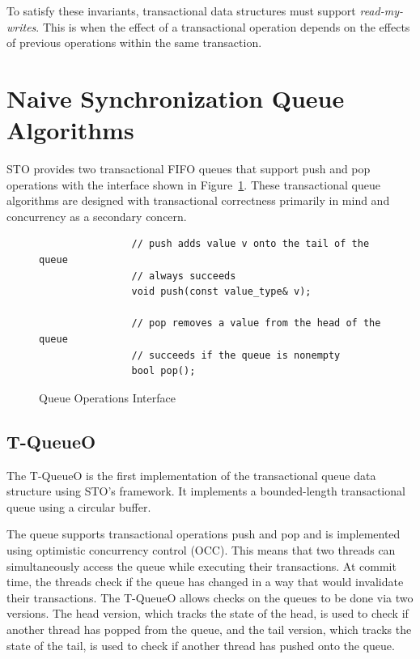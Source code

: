 \noindent
To satisfy these invariants, transactional data structures must support \emph{read-my-writes}. This is when the effect of a transactional operation depends on the effects of previous operations within the same transaction.

\section{Naive Synchronization Queue Algorithms}

STO provides two transactional FIFO queues that support push and pop operations with the interface shown in Figure~\ref{fig:q_interface}. These transactional queue algorithms are designed with transactional correctness primarily in mind and concurrency as a secondary concern. 

\begin{figure}[t]
    \centering
    \begin{lstlisting}
                // push adds value v onto the tail of the queue
                // always succeeds
                void push(const value_type& v); 
               
                // pop removes a value from the head of the queue
                // succeeds if the queue is nonempty 
                bool pop();                     
    \end{lstlisting}
    \caption{Queue Operations Interface}
    \label{fig:q_interface}
\end{figure}

\subsection{T-QueueO}
The T-QueueO is the first implementation of the transactional queue data structure using STO's framework. It implements a bounded-length transactional queue using a circular buffer.

The queue supports transactional operations push and pop and is implemented using optimistic concurrency control (OCC). This means that two threads can simultaneously access the queue while executing their transactions. At commit time, the threads check if the queue has changed in a way that would invalidate their transactions. The T-QueueO allows checks on the queues to be done via two versions. The head version, which tracks the state of the head, is used to check if another thread has popped from the queue, and the tail version, which tracks the state of the tail, is used to check if another thread has pushed onto the queue.

